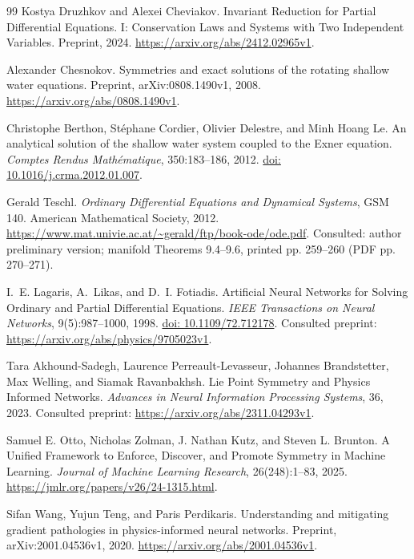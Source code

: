 \documentclass[12pt,a4paper,oneside]{report}
\numberwithin{equation}{chapter}
\theoremstyle{remark}\newtheorem{remark}[theorem]{Remark}
\newcommand{\doi}[1]{\href{https://doi.org/#1}{doi: #1}}
\begin{document}
\begin{thebibliography}{99}
Kostya Druzhkov and Alexei Cheviakov. Invariant Reduction for Partial Differential Equations. I: Conservation Laws and Systems with Two Independent Variables. Preprint, 2024. \url{https://arxiv.org/abs/2412.02965v1}.

Alexander Chesnokov. Symmetries and exact solutions of the rotating shallow water equations.
Preprint, arXiv:0808.1490v1, 2008. \url{https://arxiv.org/abs/0808.1490v1}.

Christophe Berthon, St\'ephane Cordier, Olivier Delestre, and Minh Hoang Le. An analytical solution of the shallow water system coupled to the Exner equation. \emph{Comptes Rendus Math\'ematique}, 350:183--186, 2012. \doi{10.1016/j.crma.2012.01.007}.

Gerald Teschl. \emph{Ordinary Differential Equations and Dynamical Systems}, GSM 140. American Mathematical Society, 2012. \url{https://www.mat.univie.ac.at/~gerald/ftp/book-ode/ode.pdf}. Consulted: author preliminary version; manifold Theorems 9.4--9.6, printed pp. 259--260 (PDF pp. 270--271).

I.~E. Lagaris, A.~Likas, and D.~I. Fotiadis. Artificial Neural Networks for Solving Ordinary and Partial Differential Equations. \emph{IEEE Transactions on Neural Networks}, 9(5):987--1000, 1998. \doi{10.1109/72.712178}. Consulted preprint: \url{https://arxiv.org/abs/physics/9705023v1}.

Tara Akhound-Sadegh, Laurence Perreault-Levasseur, Johannes Brandstetter, Max Welling, and Siamak Ravanbakhsh. Lie Point Symmetry and Physics Informed Networks. \emph{Advances in Neural Information Processing Systems}, 36, 2023. Consulted preprint: \url{https://arxiv.org/abs/2311.04293v1}.

Samuel E. Otto, Nicholas Zolman, J. Nathan Kutz, and Steven L. Brunton. A Unified Framework to Enforce, Discover, and Promote Symmetry in Machine Learning. \emph{Journal of Machine Learning Research}, 26(248):1--83, 2025. \url{https://jmlr.org/papers/v26/24-1315.html}.

Sifan Wang, Yujun Teng, and Paris Perdikaris. Understanding and mitigating
gradient pathologies in physics-informed neural networks. Preprint,
arXiv:2001.04536v1, 2020. \url{https://arxiv.org/abs/2001.04536v1}.


\end{thebibliography}
\end{document}
